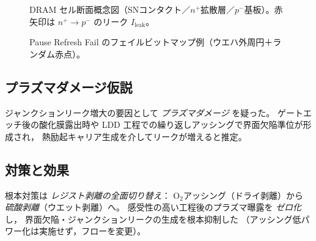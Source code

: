 \documentclass[conference]{IEEEtran}
\begin{document}
\begin{figure}[t]
\centering
{}
\caption{DRAM セル断面概念図（SNコンタクト／$n^+$拡散層／$p^-$基板）。赤矢印は $n^+ \rightarrow p^-$ のリーク $I_{\mathrm{leak}}$。}
\label{fig:dram_cross_section}
\end{figure}

\begin{figure}[t]
\centering
{}
\caption{Pause Refresh Fail のフェイルビットマップ例（ウエハ外周円＋ランダム赤点）。}
\label{fig:failmap}
\end{figure}

\subsection{プラズマダメージ仮説}
ジャンクションリーク増大の要因として \emph{プラズマダメージ} を疑った。
ゲートエッチ後の酸化膜露出時や LDD 工程での繰り返しアッシングで界面欠陥準位が形成され，
熱励起キャリア生成を介してリークが増えると推定。

\subsection{対策と効果}
根本対策は \emph{レジスト剥離の全面切り替え}：
O$_2$アッシング（ドライ剥離）から \emph{硫酸剥離}（ウエット剥離）へ。
感受性の高い工程後のプラズマ曝露を \emph{ゼロ化} し，
界面欠陥・ジャンクションリークの生成を根本抑制した
（アッシング低パワー化は実施せず，フローを変更）。
\end{document}
